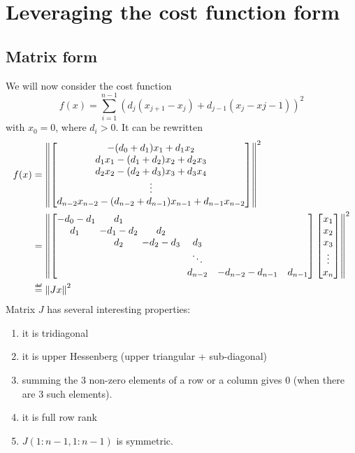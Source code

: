 \documentclass[]{article}
\newcommand{\BIN}{\begin{bmatrix}}
\newcommand{\BOUT}{\end{bmatrix}}
\newcommand\eqbydef{\mathrel{\overset{\makebox[0pt]{\mbox{\normalfont\tiny\sffamily def}}}{=}}}
\begin{document}
\section{Leveraging the cost function form}
\subsection{Matrix form}
We will now consider the cost function
\begin{equation}
  f(x) = \sum_{i=1}^{n-1} \left(d_j(x_{j+1} - x_j) + d_{j-1}(x_j - x{j-1})\right)^2
\end{equation}
with $x_0 = 0$, where $d_i>0$.
It can be rewritten
\begin{align*}
f(x) &= \left\|\BIN -(d_0+d_1)x_1 + d_1 x_2 \\ 
                    d_1 x_1 -(d_1+d_2) x_2 + d_2 x_3 \\ 
                    d_2 x_2 -(d_2+d_3) x_3 + d_3 x_4 \\ 
                    \vdots \\ 
                    d_{n-2} x_{n-2} -(d_{n-2}+d_{n-1}) x_{n-1} + d_{n-1} x_{n-2} \BOUT\right\|^2 \\
 &= \left\|\BIN -d_0-d_1 \hspace{-3pt}& d_1 & & & &\\ 
                d_1 &\hspace{-3pt} -d_1-d_2 \hspace{-3pt}& d_2 & & &\\ 
                & d_2 & \hspace{-3pt}-d_2-d_3 \hspace{-3pt}& d_3 & & \\ 
                & & & \ddots &  & \\ 
                &&& d_{n-2} & -d_{n-2}-d_{n-1} & d_{n-1} \BOUT
 \BIN x_1 \\ x_2 \\ x_3 \\ \vdots \\x_n \BOUT\right\|^2 \\
 & \eqbydef \left\|J x\right\|^2
\end{align*}
Matrix $J$ has several interesting properties:
\begin{enumerate}
	\item it is tridiagonal
  \item it is upper Hessenberg (upper triangular + sub-diagonal)
  \item summing the $3$ non-zero elements of a row or a column gives $0$ (when there are 3 such elements).
  \item it is full row rank
  \item $J(1:n-1,1:n-1)$ is symmetric.
\end{enumerate}
\end{document}
